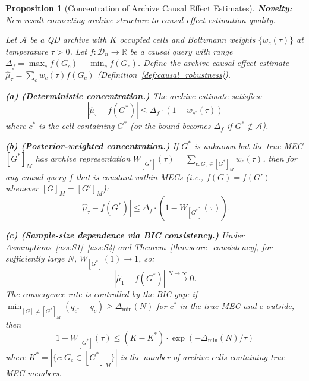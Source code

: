 \documentclass{article}
\theoremstyle{definition}
\theoremstyle{plain}
\newtheorem{proposition}{Proposition}
\theoremstyle{remark}
\begin{document}
\begin{proposition}[Concentration of Archive Causal Effect Estimates]
\label{prop:ace_concentration}
\textbf{Novelty:} New result connecting archive structure to causal effect estimation quality.

Let $\mathcal{A}$ be a QD archive with $K$ occupied cells and Boltzmann weights
$\{w_c(\tau)\}$ at temperature $\tau > 0$. Let $f : \mathcal{D}_n \to \mathbb{R}$ be a
causal query with range $\Delta_f = \max_c f(G_c) - \min_c f(G_c)$. Define the archive
causal effect estimate $\hat{\mu}_\tau = \sum_c w_c(\tau) f(G_c)$
(Definition~\ref{def:causal_robustness}).

\textbf{(a) (Deterministic concentration.)} The archive estimate satisfies:
\begin{equation}
  |\hat{\mu}_\tau - f(G^*)| \leq \Delta_f \cdot (1 - w_{c^*}(\tau))
\end{equation}
where $c^*$ is the cell containing $G^*$ (or the bound becomes $\Delta_f$ if
$G^* \notin \mathcal{A}$).

\textbf{(b) (Posterior-weighted concentration.)} If $G^*$ is unknown but the true MEC
$[G^*]_M$ has archive representation $W_{[G^*]}(\tau) = \sum_{c : G_c \in [G^*]_M} w_c(\tau)$,
then for any causal query $f$ that is constant within MECs
(i.e., $f(G) = f(G')$ whenever $[G]_M = [G']_M$):
\begin{equation}
  |\hat{\mu}_\tau - f(G^*)| \leq \Delta_f \cdot (1 - W_{[G^*]}(\tau)).
\end{equation}

\textbf{(c) (Sample-size dependence via BIC consistency.)} Under Assumptions~\ref{ass:S1}--\ref{ass:S4} and
Theorem~\ref{thm:score_consistency}, for sufficiently large $N$,
$W_{[G^*]}(1) \to 1$, so:
\begin{equation}
  |\hat{\mu}_1 - f(G^*)| \xrightarrow{N \to \infty} 0.
\end{equation}
The convergence rate is controlled by the BIC gap: if $\min_{[G] \neq [G^*]_M}
(q_{c^*} - q_c) \geq \Delta_{\min}(N)$ for $c^*$ in the true MEC and $c$ outside, then
\begin{equation}
  1 - W_{[G^*]}(\tau) \leq (K - K^*) \cdot \exp(-\Delta_{\min}(N)/\tau)
\end{equation}
where $K^* = |\{c : G_c \in [G^*]_M\}|$ is the number of archive cells containing
true-MEC members.
\end{proposition}
\end{document}
